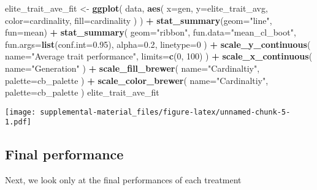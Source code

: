 \documentclass[]{book}
\newenvironment{Shaded}{\begin{snugshade}}{\end{snugshade}}
\newcommand{\DataTypeTok}[1]{\textcolor[rgb]{0.13,0.29,0.53}{#1}}
\newcommand{\DecValTok}[1]{\textcolor[rgb]{0.00,0.00,0.81}{#1}}
\newcommand{\FloatTok}[1]{\textcolor[rgb]{0.00,0.00,0.81}{#1}}
\newcommand{\KeywordTok}[1]{\textcolor[rgb]{0.13,0.29,0.53}{\textbf{#1}}}
\newcommand{\NormalTok}[1]{#1}
\newcommand{\OperatorTok}[1]{\textcolor[rgb]{0.81,0.36,0.00}{\textbf{#1}}}
\newcommand{\StringTok}[1]{\textcolor[rgb]{0.31,0.60,0.02}{#1}}
\begin{document}
\begin{Shaded}
\begin{Highlighting}[]
\NormalTok{elite_trait_ave_fit <-}\StringTok{ }\KeywordTok{ggplot}\NormalTok{(}
\NormalTok{    data,}
    \KeywordTok{aes}\NormalTok{(}
      \DataTypeTok{x=}\NormalTok{gen,}
      \DataTypeTok{y=}\NormalTok{elite_trait_avg,}
      \DataTypeTok{color=}\NormalTok{cardinality,}
      \DataTypeTok{fill=}\NormalTok{cardinality}
\NormalTok{    )}
\NormalTok{  ) }\OperatorTok{+}
\StringTok{  }\KeywordTok{stat_summary}\NormalTok{(}\DataTypeTok{geom=}\StringTok{"line"}\NormalTok{, }\DataTypeTok{fun=}\NormalTok{mean) }\OperatorTok{+}
\StringTok{  }\KeywordTok{stat_summary}\NormalTok{(}
    \DataTypeTok{geom=}\StringTok{"ribbon"}\NormalTok{,}
    \DataTypeTok{fun.data=}\StringTok{"mean_cl_boot"}\NormalTok{,}
    \DataTypeTok{fun.args=}\KeywordTok{list}\NormalTok{(}\DataTypeTok{conf.int=}\FloatTok{0.95}\NormalTok{),}
    \DataTypeTok{alpha=}\FloatTok{0.2}\NormalTok{,}
    \DataTypeTok{linetype=}\DecValTok{0}
\NormalTok{  ) }\OperatorTok{+}
\StringTok{  }\KeywordTok{scale_y_continuous}\NormalTok{(}
    \DataTypeTok{name=}\StringTok{"Average trait performance"}\NormalTok{,}
    \DataTypeTok{limits=}\KeywordTok{c}\NormalTok{(}\DecValTok{0}\NormalTok{, }\DecValTok{100}\NormalTok{)}
\NormalTok{  ) }\OperatorTok{+}
\StringTok{  }\KeywordTok{scale_x_continuous}\NormalTok{(}
    \DataTypeTok{name=}\StringTok{"Generation"}
\NormalTok{  ) }\OperatorTok{+}
\StringTok{  }\KeywordTok{scale_fill_brewer}\NormalTok{(}
    \DataTypeTok{name=}\StringTok{"Cardinaltiy"}\NormalTok{,}
    \DataTypeTok{palette=}\NormalTok{cb_palette}
\NormalTok{  ) }\OperatorTok{+}
\StringTok{  }\KeywordTok{scale_color_brewer}\NormalTok{(}
    \DataTypeTok{name=}\StringTok{"Cardinaltiy"}\NormalTok{,}
    \DataTypeTok{palette=}\NormalTok{cb_palette}
\NormalTok{  )}
\NormalTok{elite_trait_ave_fit}
\end{Highlighting}
\end{Shaded}

\texttt{[image: supplemental-material\_files/figure-latex/unnamed-chunk-5-1.pdf]}

\hypertarget{final-performance}{%
\subsection{Final performance}\label{final-performance}}

Next, we look only at the final performances of each treatment
\end{document}

